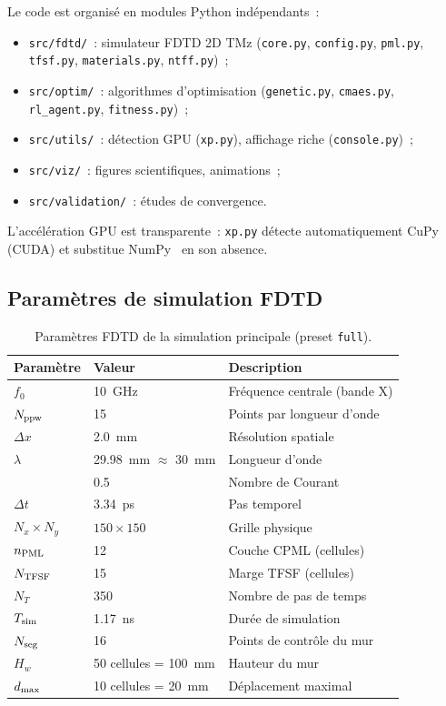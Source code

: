 \documentclass[12pt,a4paper]{article}
\newcommand{\dx}{\Delta x}
\newcommand{\dt}{\Delta t}
\DeclareMathOperator{\Sc}{S_c}
\begin{document}
Le code est organisé en modules Python indépendants~:
\begin{itemize}
    \item \texttt{src/fdtd/}~: simulateur FDTD 2D TMz (\texttt{core.py},
          \texttt{config.py}, \texttt{pml.py}, \texttt{tfsf.py},
          \texttt{materials.py}, \texttt{ntff.py})~;
    \item \texttt{src/optim/}~: algorithmes d'optimisation (\texttt{genetic.py},
          \texttt{cmaes.py}, \texttt{rl\_agent.py}, \texttt{fitness.py})~;
    \item \texttt{src/utils/}~: détection GPU (\texttt{xp.py}), affichage riche (\texttt{console.py})~;
    \item \texttt{src/viz/}~: figures scientifiques, animations~;
    \item \texttt{src/validation/}~: études de convergence.
\end{itemize}
L'accélération GPU est transparente~: \texttt{xp.py} détecte automatiquement
CuPy~\cite{CuPy2017} (CUDA) et substitue NumPy~\cite{Harris2020} en son absence.

\subsection{Paramètres de simulation FDTD}
\label{ssec:fdtd-params}

\begin{table}[htbp]
\centering
\caption{Paramètres FDTD de la simulation principale (preset \texttt{full}).}
\label{tab:fdtd-params}
\begin{tabular}{lll}
\toprule
\textbf{Paramètre} & \textbf{Valeur} & \textbf{Description} \\
\midrule
$f_0$ & \SI{10}{\giga\hertz} & Fréquence centrale (bande X) \\
$N_{\rm ppw}$ & 15 & Points par longueur d'onde \\
$\dx$ & \SI{2.0}{\milli\metre} & Résolution spatiale \\
$\lambda$ & \SI{29.98}{\milli\metre} $\approx$ \SI{30}{\milli\metre} & Longueur d'onde \\
$\Sc$ & 0.5 & Nombre de Courant \\
$\dt$ & \SI{3.34}{\pico\second} & Pas temporel \\
$N_x \times N_y$ & $150 \times 150$ & Grille physique \\
$n_{\rm PML}$ & 12 & Couche CPML (cellules) \\
$N_{\rm TFSF}$ & 15 & Marge TFSF (cellules) \\
$N_T$ & 350 & Nombre de pas de temps \\
$T_{\rm sim}$ & \SI{1.17}{\nano\second} & Durée de simulation \\
$N_{\rm seg}$ & 16 & Points de contrôle du mur \\
$H_w$ & 50 cellules = \SI{100}{\milli\metre} & Hauteur du mur \\
$d_{\rm max}$ & 10 cellules = \SI{20}{\milli\metre} & Déplacement maximal \\
\bottomrule
\end{tabular}
\end{table}
\end{document}

